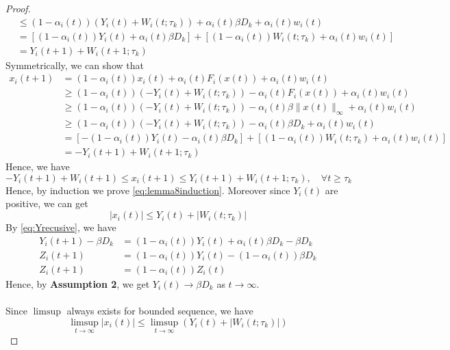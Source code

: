 \begin{proof}
\begin{align*}
         &\le (1-\alpha_i(t))(Y_i(t) + W_i(t;\tau_k)) + \alpha_i(t)\beta D_k + \alpha_i(t)w_i(t)\tag{$\|x(t)\|_\infty \le D_k$}\\
         & =[(1-\alpha_i(t))Y_i(t) + \alpha_i(t)\beta D_k] + [(1-\alpha_i(t)) W_i(t;\tau_k) + \alpha_i(t)w_i(t)]\\
         &= Y_i(t+1) + W_i(t+1;\tau_k)
    \end{align*}
    Symmetrically, we can show that
    \begin{align*}
         x_i(t+1) &= (1-\alpha_i(t))x_i(t) + \alpha_i(t)F_i(x(t)) + \alpha_i(t)w_i(t)\\
         &\ge (1-\alpha_i(t))(-Y_i(t) + W_i(t;\tau_k)) - \alpha_i(t)F_i(x(t)) + \alpha_i(t)w_i(t)\tag{Induction}\\
         &\ge (1-\alpha_i(t))(-Y_i(t) + W_i(t;\tau_k)) - \alpha_i(t)\beta\|x(t)\|_\infty + \alpha_i(t)w_i(t)\tag{Assumption 3}\\
         &\ge (1-\alpha_i(t))(-Y_i(t) + W_i(t;\tau_k)) - \alpha_i(t)\beta D_k + \alpha_i(t)w_i(t)\tag{$\|x(t)\|_\infty \le D_k$}\\
         & =[-(1-\alpha_i(t))Y_i(t) - \alpha_i(t)\beta D_k] + [(1-\alpha_i(t)) W_i(t;\tau_k) + \alpha_i(t)w_i(t)]\\
         &= -Y_i(t+1) + W_i(t+1;\tau_k)
    \end{align*}
    Hence, we have
    $$
    -Y_i(t+1) + W_i(t+1)\le x_i(t+1)\le Y_i(t+1) + W_i(t+1;\tau_k),\quad\forall t\ge \tau_k
    $$
    Hence, by induction we prove \autoref{eq:lemma8induction}. Moreover since $Y_i(t)$ are positive, we can get
    \begin{equation}\label{eq:xiboundedlast}
        |x_i(t)| \le Y_i(t) + |W_i(t;\tau_k)|
    \end{equation}
    By \autoref{eq:Yrecusive}, we have
    \begin{align*}
        Y_i(t+1) -\beta D_k &= (1-\alpha_i(t))Y_i(t)+\alpha_i(t)\beta D_k -\beta D_k\\
        Z_i(t+1) &= (1-\alpha_i(t))Y_i(t)-(1-\alpha_i(t))\beta D_k\tag{$Z_i(t):= Y_i(t)-\beta D_k$}\\
        Z_i(t+1) &= (1-\alpha_i(t)) Z_i(t)
    \end{align*}
    Hence, by \textbf{Assumption 2}, we get $Y_i(t)\to \beta D_k$ as $t\to \infty$.\\
    \\
    Since $\limsup$ always exists for bounded sequence, we have
    \begin{equation}
        \limsup_{t\to\infty} |x_i(t)| \le \limsup_{t\to\infty} (Y_i(t) + |W_i(t;\tau_k)|)

\end{equation}
\end{proof}
